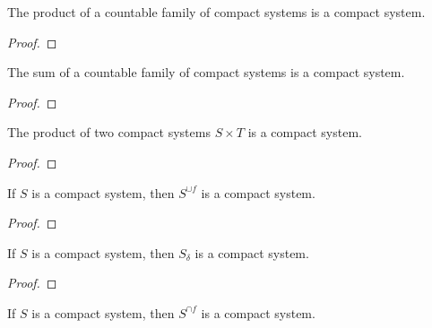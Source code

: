 \begin{lemma}\label{lem:IsCompactSystem.pi}
The product of a countable family of compact systems is a compact system.
\end{lemma}

\begin{proof}

\end{proof}


\begin{lemma}\label{lem:IsCompactSystem.sigma}
  \mathlibok
The sum of a countable family of compact systems is a compact system.
\end{lemma}

\begin{proof}\mathlibok

\end{proof}


\begin{lemma}\label{lem:IsCompactSystem.prod}
  \mathlibok
The product of two compact systems $S \times T$ is a compact system.
\end{lemma}

\begin{proof}\mathlibok

\end{proof}


\begin{lemma}\label{lem:IsCompactSystem.supClosure}
  \mathlibok
If $S$ is a compact system, then $S^{\cup f}$ is a compact system.
\end{lemma}

\begin{proof}\mathlibok

\end{proof}


\begin{lemma}\label{lem:IsCompactSystem.countableInfClosure}
If $S$ is a compact system, then $S_\delta$ is a compact system.
\end{lemma}

\begin{proof}

\end{proof}


\begin{lemma}\label{lem:IsCompactSystem.infClosure}
  \mathlibok
If $S$ is a compact system, then $S^{\cap f}$ is a compact system.
\end{lemma}

